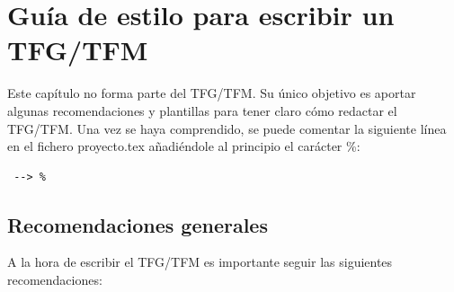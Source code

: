 

\chapter*{Guía de estilo para escribir un TFG/TFM} 

Este capítulo no forma parte del TFG/TFM. Su único objetivo es aportar algunas recomendaciones y plantillas para tener claro cómo redactar el TFG/TFM. Una vez se haya comprendido, se puede comentar la siguiente línea en el fichero proyecto.tex añadiéndole al principio el carácter \%: 
\begin{verbatim}
 --> %
\end{verbatim}

\section*{Recomendaciones generales}
A la hora de escribir el TFG/TFM es importante seguir las siguientes recomendaciones: 

